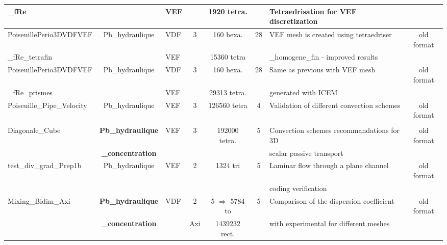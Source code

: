 \begin{table}[H]
\begin{centering}
\begin{tabular}{lclccclc}
\rowcolor{LimeGreen!10}\_fRe & & VEF & & 1920 tetra. & &  Tetraedrisation for VEF discretization & \\
\hline
\rowcolor{LimeGreen!10}PoiseuillePerio3DVDFVEF & Pb\_hydraulique & VDF & 3 & 160 hexa. & 28 & VEF mesh is created using tetraedriser& old format \\ 
\rowcolor{LimeGreen!10}\_fRe\_tetrafin & & VEF & & 15360 tetra & &  \_homogene\_fin - improved results &  \\
\hline
\rowcolor{LimeGreen!10}PoiseuillePerio3DVDFVEF & Pb\_hydraulique & VDF & 3 & 160 hexa. & 28 & Same as previous with VEF mesh & old format \\ 
\rowcolor{LimeGreen!10}\_fRe\_prismes & & VEF & & 29313 tetra. & & generated with ICEM &  \\
\hline
\rowcolor{LimeGreen!10}Poiseuille\_Pipe\_Velocity & Pb\_hydraulique & VEF & 3 & 126560 tetra & 4 & Validation of different convection schemes & old format \\ 
\rowcolor{LimeGreen!10} & & & & & & & \\
\hline
\rowcolor{LimeGreen!10}Diagonale\_Cube & \textbf{Pb\_hydraulique} & VEF & 3 & 192000 tetra. & 5 & Convection schemes recommandations for 3D  & old format \\ 
\rowcolor{LimeGreen!10} & \textbf{\_concentration} & & & & & scalar passive transport & \\
\hline
\rowcolor{LimeGreen!10} test\_div\_grad\_Prep1b & Pb\_hydraulique & VEF & 2 & 1324 tri & 5 & Laminar flow through a plane channel & old format \\
\rowcolor{LimeGreen!10} & & & & & & coding verification & \\
\hline
\rowcolor{LimeGreen!10}Mixing\_Bidim\_Axi & \textbf{Pb\_hydraulique} & VDF & 2 & 5 $\Rightarrow$ 5784 to & 5 & Comparison of the dispersion coefficient & old format \\ 
\rowcolor{LimeGreen!10} & \textbf{\_concentration} & & Axi & 1439232 rect. & & with experimental for different meshes & \\
\hline
\end{tabular}
\end{centering}
\end{table}

\newpage

